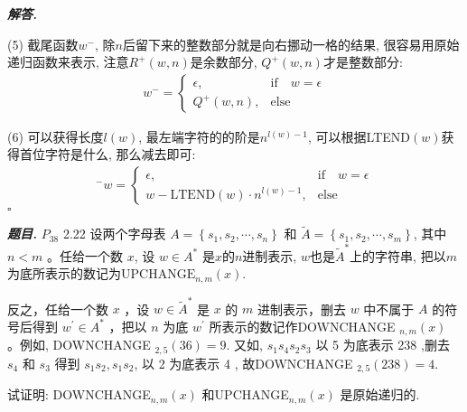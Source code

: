 \documentclass[10pt, a4paper, oneside]{ctexart}
\newenvironment{problem}{\begin{framed}\par\noindent\textbf{\textit{题目. }}}{\end{framed}\par}
\newenvironment{solution}{%
  \par\noindent\textbf{\textit{解答. }}\ignorespaces
}{%
  \hfill\ensuremath{\square}\par %
}
\begin{document}
\begin{solution}
(5) 截尾函数$w^-$, 除$n$后留下来的整数部分就是向右挪动一格的结果, 很容易用原始递归函数来表示, 注意$R^+(w,n)$是余数部分, $Q^+(w,n)$才是整数部分:
\begin{align*}
    w^{-}=\begin{cases}
        \epsilon,& \text{if}\quad w=\epsilon\\
        Q^{+}(w,n), &\text{else}
    \end{cases}
\end{align*}

(6) 可以获得长度$l(w)$, 最左端字符的的阶是$n^{l(w)-1}$, 可以根据LTEND$(w)$获得首位字符是什么, 那么减去即可:
\begin{align*}
    ^-w=\begin{cases}
        \epsilon, &\text{if}\quad w=\epsilon\\
        w-\text{LTEND}(w)\cdot n^{l(w)-1}, &\text{else}
    \end{cases}
\end{align*}
\end{solution}

\begin{problem}
    $P_{38}$ 2.22 设两个字母表 $A=\left\{s_1, s_2, \cdots, s_n\right\}$ 和 $\tilde{A}=\left\{s_1, s_2, \cdots, s_m\right\}$, 其中 $n<m$ 。任给一个数 $x$, 设 $w \in A^*$ 是$x$的$n$进制表示, $w$也是$\tilde{A}^*$上的字符串, 把以$m$为底所表示的数记为$\text{UPCHANGE}_{n,m}(x)$.

    反之，任给一个数 $x$ ，设 $w \in \tilde{A}^*$ 是 $x$ 的 $m$ 进制表示，删去 $w$ 中不属于 $A$ 的符号后得到 $w^{\prime} \in A^*$ ，把以 $n$ 为底 $w^{\prime}$ 所表示的数记作DOWNCHANGE ${ }_{n, m}(x)$ 。例如, DOWNCHANGE ${ }_{2,5}(36)=9$. 又如, $s_1 s_4 s_2 s_3$ 以 5 为底表示 238 ,删去 $s_4$ 和 $s_3$ 得到 $s_1 s_2, s_1 s_2$, 以 2 为底表示 4 , 故DOWNCHANGE ${ }_{2,5}(238)=4$.
    
    试证明: DOWNCHANGE$_{n, m}(x)$ 和UPCHANGE$_{n, m}(x)$ 是原始递归的.
\end{problem}
\end{document}
